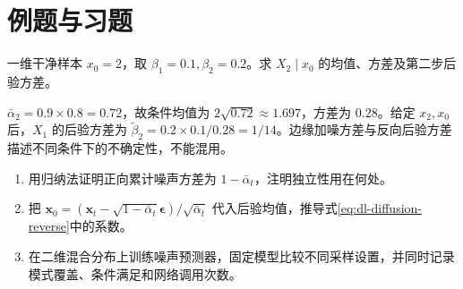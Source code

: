 \section{例题与习题}
\begin{example}[两步加噪]
一维干净样本 $x_0=2$，取 $\beta_1=0.1,\beta_2=0.2$。求 $X_2\mid x_0$ 的均值、方差及第二步后验方差。
\end{example}
\begin{solve}
$\bar\alpha_2=0.9\times0.8=0.72$，故条件均值为 $2\sqrt{0.72}\approx1.697$，方差为 $0.28$。给定 $x_2,x_0$ 后，$X_1$ 的后验方差为 $\widetilde\beta_2=0.2\times0.1/0.28=1/14$。边缘加噪方差与反向后验方差描述不同条件下的不确定性，不能混用。
\end{solve}
\begin{enumerate}
\item 用归纳法证明正向累计噪声方差为 $1-\bar\alpha_t$，注明独立性用在何处。
\item 把 $\mathbf x_0=(\mathbf x_t-\sqrt{1-\bar\alpha_t}\boldsymbol\epsilon)/\sqrt{\bar\alpha_t}$ 代入后验均值，推导式\eqref{eq:dl-diffusion-reverse}中的系数。
\item 在二维混合分布上训练噪声预测器，固定模型比较不同采样设置，并同时记录模式覆盖、条件满足和网络调用次数。
\end{enumerate}

